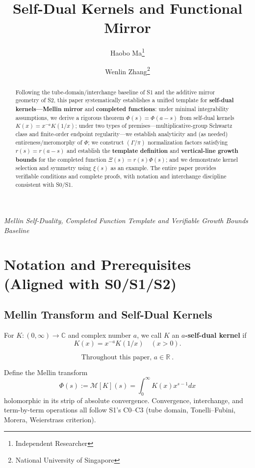 \documentclass[11pt,a4paper]{article}
\title{Self-Dual Kernels and Functional Mirror}
\author{Haobo Ma\thanks{Independent Researcher} \and Wenlin Zhang\thanks{National University of Singapore}}
\date{}
\theoremstyle{remark}
\begin{document}
\maketitle

\begin{center}
\textit{Mellin Self-Duality, Completed Function Template and Verifiable Growth Bounds Baseline}
\end{center}

\begin{abstract}
Following the tube-domain/interchange baseline of S1 and the additive mirror geometry of S2, this paper systematically establishes a unified template for \textbf{self-dual kernels---Mellin mirror} and \textbf{completed functions}: under minimal integrability assumptions, we derive a rigorous theorem $\Phi(s)=\Phi(a-s)$ from self-dual kernels $K(x)=x^{-a}K(1/x)$; under two types of premises---multiplicative-group Schwartz class and finite-order endpoint regularity---we establish analyticity and (as needed) entireness/meromorphy of $\Phi$; we construct $(\Gamma/\pi)$ normalization factors satisfying $r(s)=r(a-s)$ and establish the \textbf{template definition} and \textbf{vertical-line growth bounds} for the completed function $\Xi(s)=r(s)\Phi(s)$; and we demonstrate kernel selection and symmetry using $\xi(s)$ as an example. The entire paper provides verifiable conditions and complete proofs, with notation and interchange discipline consistent with S0/S1.
\end{abstract}

\section{Notation and Prerequisites (Aligned with S0/S1/S2)}

\subsection{Mellin Transform and Self-Dual Kernels}

For $K:(0,\infty)\to\mathbb{C}$ and complex number $a$, we call $K$ an \textbf{$a$-self-dual kernel} if
\begin{equation}
K(x)=x^{-a}K(1/x)\quad(x>0).
\end{equation}

\begin{equation}
\boxed{\ \text{Throughout this paper, }a\in\mathbb{R}\ .\ }
\end{equation}

Define the Mellin transform
\begin{equation}
\Phi(s):=\mathcal{M}[K](s)=\int_0^\infty K(x) x^{s-1} dx
\end{equation}
holomorphic in its strip of absolute convergence. Convergence, interchange, and term-by-term operations all follow S1's C0--C3 (tube domain, Tonelli--Fubini, Morera, Weierstrass criterion).
\end{document}
